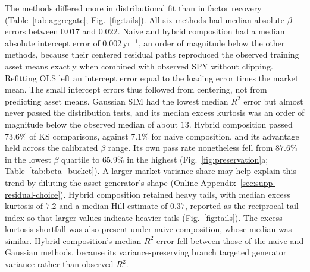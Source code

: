 The methods differed more in distributional fit than in factor
recovery (Table~\ref{tab:aggregate}; Fig.~\ref{fig:tails}). All six
methods had median absolute $\beta$ errors between $0.017$ and
$0.022$. Naive and hybrid composition had a median absolute intercept
error of $0.002\,\mathrm{yr}^{-1}$, an order of magnitude below the
other methods, because their centered residual paths reproduced the
observed training asset means exactly when combined with observed SPY
without clipping. Refitting OLS left an intercept error equal to the
loading error times the market mean. The small intercept errors thus
followed from centering, not from predicting asset means. Gaussian SIM had the
lowest median $R^2$ error but almost never passed the distribution
tests, and its median excess kurtosis was an order of magnitude below
the observed median of about $13$. Hybrid composition passed
$73.6\%$ of KS comparisons, against $7.1\%$ for naive composition,
and its advantage held across the calibrated $\beta$ range. Its own
pass rate nonetheless fell from $87.6\%$ in the lowest $\beta$
quartile to $65.9\%$ in the highest
(Fig.~\ref{fig:preservation}a; Table~\ref{tab:beta_bucket}). A larger market variance share may help explain this trend by
diluting the asset generator's shape (Online
Appendix~\ref{sec:supp-residual-choice}). Hybrid composition
retained heavy tails, with median excess kurtosis of $7.2$ and a
median Hill estimate of $0.37$, reported as the reciprocal tail index
so that larger values indicate heavier tails (Fig.~\ref{fig:tails}).
The excess-kurtosis shortfall was also present under naive
composition, whose median was similar. Hybrid composition's median
$R^2$ error fell between those of the naive and Gaussian methods,
because its variance-preserving branch targeted generator variance
rather than observed $R^2$.

